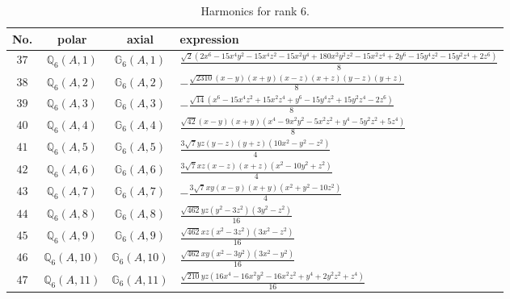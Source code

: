 \documentclass[fleqn,8pt,landscape]{jsarticle}
\begin{document}
\begin{table}[ht!]
\begin{center}
\caption{Harmonics for rank 6.}
\renewcommand{\arraystretch}{1.3}
\begin{tabular}{cccl} \hline \hline
No. & polar & axial & expression \\ \hline
$ 37 $ & $ \mathbb{Q}_{6}(A,1) $ & $ \mathbb{G}_{6}(A,1) $ & $ \frac{\sqrt{2} \left(2 x^{6} - 15 x^{4} y^{2} - 15 x^{4} z^{2} - 15 x^{2} y^{4} + 180 x^{2} y^{2} z^{2} - 15 x^{2} z^{4} + 2 y^{6} - 15 y^{4} z^{2} - 15 y^{2} z^{4} + 2 z^{6}\right)}{8} $ \\
$ 38 $ & $ \mathbb{Q}_{6}(A,2) $ & $ \mathbb{G}_{6}(A,2) $ & $ - \frac{\sqrt{2310} \left(x - y\right) \left(x + y\right) \left(x - z\right) \left(x + z\right) \left(y - z\right) \left(y + z\right)}{8} $ \\
$ 39 $ & $ \mathbb{Q}_{6}(A,3) $ & $ \mathbb{G}_{6}(A,3) $ & $ - \frac{\sqrt{14} \left(x^{6} - 15 x^{4} z^{2} + 15 x^{2} z^{4} + y^{6} - 15 y^{4} z^{2} + 15 y^{2} z^{4} - 2 z^{6}\right)}{8} $ \\
$ 40 $ & $ \mathbb{Q}_{6}(A,4) $ & $ \mathbb{G}_{6}(A,4) $ & $ \frac{\sqrt{42} \left(x - y\right) \left(x + y\right) \left(x^{4} - 9 x^{2} y^{2} - 5 x^{2} z^{2} + y^{4} - 5 y^{2} z^{2} + 5 z^{4}\right)}{8} $ \\
$ 41 $ & $ \mathbb{Q}_{6}(A,5) $ & $ \mathbb{G}_{6}(A,5) $ & $ \frac{3 \sqrt{7} y z \left(y - z\right) \left(y + z\right) \left(10 x^{2} - y^{2} - z^{2}\right)}{4} $ \\
$ 42 $ & $ \mathbb{Q}_{6}(A,6) $ & $ \mathbb{G}_{6}(A,6) $ & $ \frac{3 \sqrt{7} x z \left(x - z\right) \left(x + z\right) \left(x^{2} - 10 y^{2} + z^{2}\right)}{4} $ \\
$ 43 $ & $ \mathbb{Q}_{6}(A,7) $ & $ \mathbb{G}_{6}(A,7) $ & $ - \frac{3 \sqrt{7} x y \left(x - y\right) \left(x + y\right) \left(x^{2} + y^{2} - 10 z^{2}\right)}{4} $ \\
$ 44 $ & $ \mathbb{Q}_{6}(A,8) $ & $ \mathbb{G}_{6}(A,8) $ & $ \frac{\sqrt{462} y z \left(y^{2} - 3 z^{2}\right) \left(3 y^{2} - z^{2}\right)}{16} $ \\
$ 45 $ & $ \mathbb{Q}_{6}(A,9) $ & $ \mathbb{G}_{6}(A,9) $ & $ \frac{\sqrt{462} x z \left(x^{2} - 3 z^{2}\right) \left(3 x^{2} - z^{2}\right)}{16} $ \\
$ 46 $ & $ \mathbb{Q}_{6}(A,10) $ & $ \mathbb{G}_{6}(A,10) $ & $ \frac{\sqrt{462} x y \left(x^{2} - 3 y^{2}\right) \left(3 x^{2} - y^{2}\right)}{16} $ \\
$ 47 $ & $ \mathbb{Q}_{6}(A,11) $ & $ \mathbb{G}_{6}(A,11) $ & $ \frac{\sqrt{210} y z \left(16 x^{4} - 16 x^{2} y^{2} - 16 x^{2} z^{2} + y^{4} + 2 y^{2} z^{2} + z^{4}\right)}{16} $ \\

\end{tabular}
\end{center}
\end{table}
\end{document}
